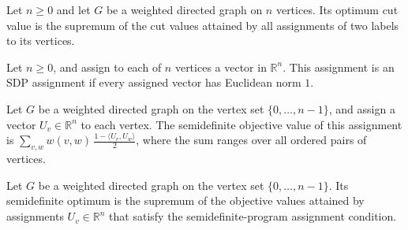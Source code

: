 \begin{definition}
\label{BooleanAnalysis.GaussianSpace.MaxCut.optimum}
\leanok
{}
Let $n\ge 0$ and let $G$ be a weighted directed graph on $n$ vertices. Its optimum cut
value is the supremum of the cut values attained by all assignments of two labels to its
vertices.
\end{definition}

\begin{definition}
\label{BooleanAnalysis.GaussianSpace.MaxCut.IsSDPAssignment}
\leanok
Let $n\ge 0$, and assign to each of $n$ vertices a vector in $\mathbb R^n$. This
assignment is an SDP assignment if every assigned vector has Euclidean norm $1$.
\end{definition}

\begin{definition}
\label{BooleanAnalysis.GaussianSpace.MaxCut.sdpValue}
\leanok
{}
Let $G$ be a weighted directed graph on the vertex set $\{0,\ldots,n-1\}$, and assign
a vector $U_v\in\mathbb{R}^n$ to each vertex. The semidefinite objective value of this
assignment is $\displaystyle \sum_{v,w} w(v,w)\,\frac{1-\langle
U_v,U_w\rangle}{2}$, where the sum ranges over all ordered pairs of vertices.
\end{definition}

\begin{definition}
\label{BooleanAnalysis.GaussianSpace.MaxCut.sdpOptimum}
\leanok
{}
Let $G$ be a weighted directed graph on the vertex set $\{0,\ldots,n-1\}$. Its
semidefinite optimum is the supremum of the objective values attained by assignments
$U_v\in\mathbb{R}^n$ that satisfy the semidefinite-program assignment condition.
\end{definition}

